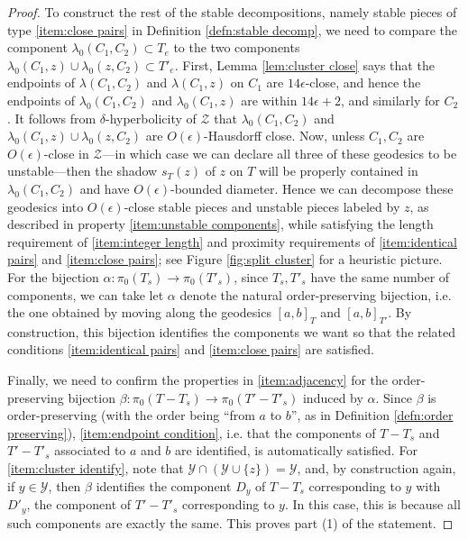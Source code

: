 \documentclass[10pt,a4paper]{amsart}
\newcommand{\calY}{\mathcal{Y}}
\newcommand{\calZ}{\mathcal{Z}}
\begin{document}
\begin{proof}
To construct the rest of the stable decompositions, namely stable pieces of type \eqref{item:close pairs} in Definition \ref{defn:stable decomp}, we need to compare the component $\lambda_0(C_1, C_2) \subset T_e$ to the two components $\lambda_0(C_1,z) \cup \lambda_0(z, C_2) \subset T'_e$.  First, Lemma \ref{lem:cluster close} says that the endpoints of $\lambda(C_1,C_2)$ and $\lambda(C_1,z)$ on $C_1$ are $14\epsilon$-close, and hence the endpoints of $\lambda_0(C_1,C_2)$ and $\lambda_0(C_1,z)$ are within $14\epsilon+2$, and similarly for $C_2$.  It follows from $\delta$-hyperbolicity of $\calZ$ that $\lambda_0(C_1, C_2)$ and $ \lambda_0(C_1,z) \cup \lambda_0(z, C_2)$ are $O(\epsilon)$-Hausdorff close.  Now, unless $C_1,C_2$ are $O(\epsilon)$-close in $\calZ$---in which case we can declare all three of these geodesics to be unstable---then the shadow $s_T(z)$ of $z$ on $T$ will be properly contained in $\lambda_0(C_1,C_2)$ and have $O(\epsilon)$-bounded diameter.    Hence we can decompose these geodesics into $O(\epsilon)$-close stable pieces and unstable pieces labeled by $z$, as described in property \eqref{item:unstable components}, while satisfying the length requirement of \eqref{item:integer length} and proximity requirements of \eqref{item:identical pairs} and \eqref{item:close pairs}; see Figure \ref{fig:split cluster} for a heuristic picture.  For the bijection $\alpha:\pi_0(T_s) \to \pi_0(T'_s)$, since $T_s,T'_s$ have the same number of components, we can take let $\alpha$ denote the natural order-preserving bijection, i.e. the one obtained by moving along the geodesics $[a,b]_{T}$ and $[a,b]_{T'}$.  By construction, this bijection identifies the components we want so that the related conditions \eqref{item:identical pairs} and \eqref{item:close pairs} are satisfied.

Finally, we need to confirm the properties in \eqref{item:adjacency} for the order-preserving bijection $\beta:\pi_0(T - T_s) \to \pi_0 (T'-T'_s)$ induced by $\alpha$.  Since $\beta$ is order-preserving (with the order being ``from $a$ to $b$'', as in Definition \ref{defn:order preserving}), \eqref{item:endpoint condition}, i.e. that the components of $T-T_s$ and $T' - T'_s$ associated to $a$ and $b$ are identified, is automatically satisfied.  For \eqref{item:cluster identify}, note that $\calY \cap (\calY \cup \{z\}) = \calY$, and, by construction again, if $y \in \calY$, then $\beta$ identifies the component $D_y$ of $T- T_s$ corresponding to $y$ with $D'_y$, the component of $T'-T'_s$ corresponding to $y$.  In this case, this is because all such components are exactly the same.   This proves part (1) of the statement.


\end{proof}
\end{document}
